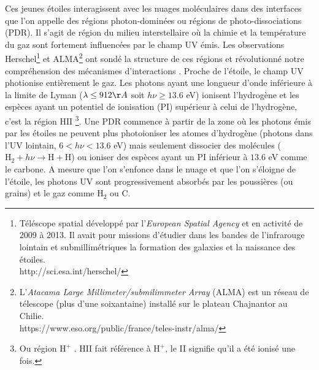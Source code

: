 \documentclass[11pt,a4paper,twoside,openright]{article}
\begin{document}
\begin{spacing}{0.98}
Ces jeunes étoiles interagissent avec les nuages moléculaires dans des interfaces que l'on appelle des régions photon-dominées ou régions de photo-dissociations (PDR). Il s'agit de région du milieu interstellaire où la chimie et la température du gaz sont fortement influencées par le champ UV émis. Les observations Herschel\footnote{Téléscope spatial développé par l'\textit{European Spatial Agency} et en activité de 2009 à 2013. Il avait pour missions d'étudier dans les bandes de l'infrarouge lointain et submillimétriques la formation des galaxies et la naissance des étoiles. \\ 
 http://sci.esa.int/herschel/} et ALMA\footnote{
L'\textit{Atacama Large Millimeter/submilimmeter Array} (ALMA) est un réseau de télescope (plus d'une soixantaine) installé sur le plateau Chajnantor au Chilie. \\
 https://www.eso.org/public/france/teles-instr/alma/} ont sondé la structure de ces régions et révolutionné notre compréhension des mécanismes d'interactions \cite{Goicoechea2016, COJoblin}.
Proche de l'étoile, le champ UV photionise entièrement le gaz. Les photons ayant une longueur d'onde inférieure à la limite de Lyman ($\lambda \leq 912 \AA$ soit $h\nu \geq 13.6$ eV) ionisent l'hydrogène et les espèces ayant un potentiel de ionisation (PI) supérieur à celui de l'hydrogène, c'est la \og région $\mathrm{HII}$ \fg{} \footnote{Ou \og région $\mathrm{H}^+$ \fg{}. $\mathrm{HII}$ fait référence à $\mathrm{H}^+$, le II signifie qu'il a été ionisé une fois.}. Une PDR commence à partir de la zone où les photons émis par les étoiles ne peuvent plus photoioniser les atomes d'hydrogène (photons dans l'UV lointain, $6<h\nu<13.6$ eV) mais seulement dissocier des molécules ($\mathrm{H}_2 + h\nu \rightarrow \mathrm{H}+\mathrm{H}$) ou ioniser des espèces ayant un PI inférieur à $13.6$ eV comme le carbone. A mesure que l'on s'enfonce dans le nuage et que l'on s'éloigne de l'étoile, les photons UV sont progressivement absorbés par les poussières (ou grains) et le gaz comme $\mathrm{H}_2$ ou $\mathrm{C}$.

\end{spacing}
\end{document}
